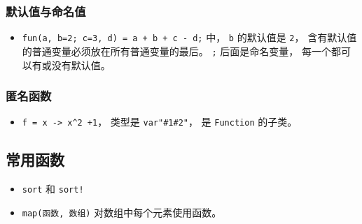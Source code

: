 \subsubsection{默认值与命名值}
\begin{itemize}
\item \verb|fun(a, b=2; c=3, d) = a + b + c - d;| 中， \verb|b| 的默认值是 \verb|2|， 含有默认值的普通变量必须放在所有普通变量的最后。 \verb|;| 后面是命名变量， 每一个都可以有或没有默认值。
\end{itemize}


\subsubsection{匿名函数}
\begin{itemize}
\item \verb|f = x -> x^2 +1|， 类型是 \verb|var"#1#2"|， 是 \verb|Function| 的子类。
\end{itemize}

\subsection{常用函数}
\begin{itemize}
\item \verb|sort| 和 \verb|sort!|
\item \verb|map(函数, 数组)| 对数组中每个元素使用函数。
\end{itemize}
